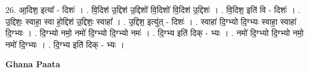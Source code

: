\documentclass[17pt]{extarticle}
\begin{document}
26. आ॒दिश॒ इत्या᳚ - दिशः॑ । . वि॒दिश॑ उ॒द्दिश॑ उ॒द्दिशो॑ वि॒दिशो॑ वि॒दिश॑ उ॒द्दिशः॑ । . वि॒दिश॒ इति॑ वि - दिशः॑ । . उ॒द्दिशः॒ स्वाहा॒ स्वा हो॒द्दिश॑ उ॒द्दिशः॒ स्वाहा᳚ । . उ॒द्दिश॒ इत्यु॑त् - दिशः॑ । . स्वाहा॑ दि॒ग्भ्यो दि॒ग्भ्यः स्वाहा॒ स्वाहा॑ दि॒ग्भ्यः । . दि॒ग्भ्यो नमो॒ नमो॑ दि॒ग्भ्यो दि॒ग्भ्यो नमः॑ । . दि॒ग्भ्य इति॑ दिक् - भ्यः । . नमो॑ दि॒ग्भ्यो दि॒ग्भ्यो नमो॒ नमो॑ दि॒ग्भ्यः । . दि॒ग्भ्य इति॑ दिक् - भ्यः । \newline

\textbf{Ghana Paata } \newline
\end{document}
